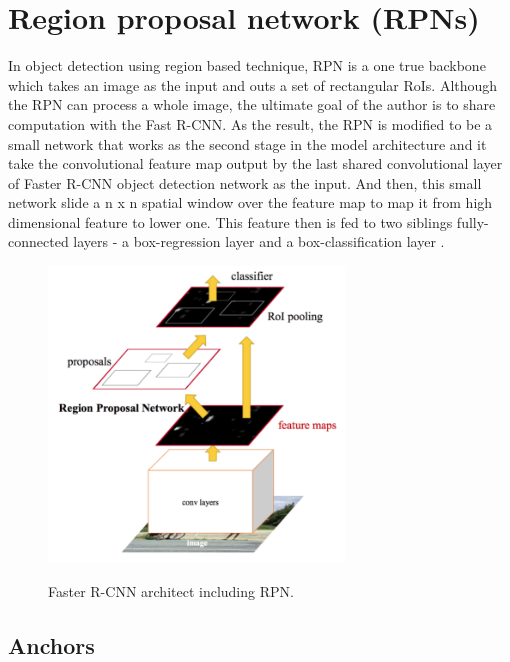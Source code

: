 	
\section{Region proposal network (RPNs)}
\noindent	

	In object detection using region based technique, RPN is a one true backbone which takes an image as the input and outs a set of rectangular RoIs. Although the RPN can process a whole image, the ultimate goal of the author is to share computation with the Fast R-CNN. As the result, the RPN is modified to be a small network that works as the second stage in the model architecture and it take the convolutional feature map output by the last shared convolutional layer of Faster R-CNN object detection network as the input. And then, this small network slide a n x n spatial window over the feature map to map it from high dimensional feature to lower one. This feature then is fed to two siblings fully-connected layers - a box-regression layer and a box-classification layer \cite{fasterrcnn}.
	
	\begin{figure}[H]
		\centering
		{\includegraphics[width=0.7\textwidth]{./hinhanh/chap4/faster_rcnn.png}}
		\caption{Faster R-CNN architect including RPN.}
	\end{figure}
	
\subsection{Anchors}
\noindent		

